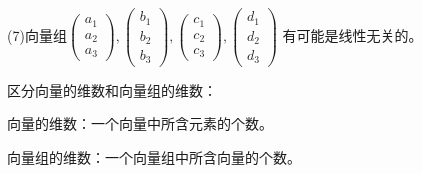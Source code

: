 \documentclass[a4paper]{report}
\begin{document}
(7)向量组$
\begin{pmatrix}
a_1\\ a_2\\ a_3
\end{pmatrix},\begin{pmatrix}
b_1\\ b_2\\ b_3
\end{pmatrix},\begin{pmatrix}
c_1\\ c_2\\ c_3
\end{pmatrix},\begin{pmatrix}
d_1\\ d_2\\ d_3
\end{pmatrix}
$
有可能是线性无关的。

\begin{tips}
区分向量的维数和向量组的维数：

向量的维数：一个向量中所含元素的个数。

向量组的维数：一个向量组中所含向量的个数。
\end{tips}
\end{document}
